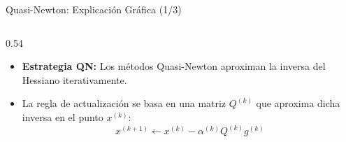 \begin{frame}{Quasi-Newton: Explicación Gráfica (1/3)}
\begin{columns}[T]
\begin{column}{0.54\textwidth}
            \vspace{0.3cm}
            \begin{itemize}
                \setlength{\itemsep}{0.8em}
                \item \textbf{Estrategia QN:} Los métodos Quasi-Newton aproximan la inversa del Hessiano iterativamente.
                \item La regla de actualización se basa en una matriz $Q^{(k)}$ que aproxima dicha inversa en el punto $x^{(k)}$:
                \[ x^{(k+1)} \leftarrow x^{(k)} - \alpha^{(k)} Q^{(k)} g^{(k)} \]
            \end{itemize}
        \end{column}
    \end{columns}
\end{frame}

